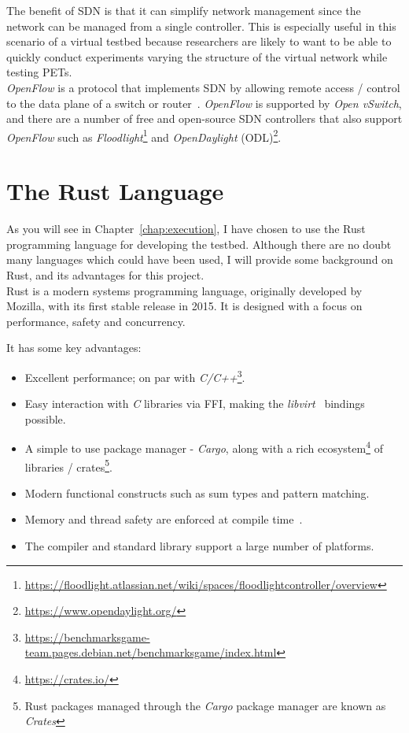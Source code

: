 \documentclass[
    author={Jacob Daniel Halsey},
    supervisor={Prof. Awais Rashid},
    degree={BSc},
    title={Building a Testbed for Evaluating Privacy Enhancing Technologies  (PETs)},
    subtitle={},
    type={software development},
    year={2021}
]{dissertation}
\begin{document}
The benefit of SDN is that it can simplify network management since the network can be 
managed from a single controller. This is especially useful in this scenario of 
a virtual testbed because researchers are likely to want to be able to quickly conduct experiments 
varying the structure of the virtual network while testing PETs.\\

\emph{OpenFlow} is a protocol that implements SDN by allowing remote access / control to the data plane
of a switch or router~\cite{openflow}. \emph{OpenFlow} is supported by \emph{Open vSwitch}, and there
are a number of free and open-source SDN controllers that also support \emph{OpenFlow} such as
\emph{Floodlight}\footnote{\url{https://floodlight.atlassian.net/wiki/spaces/floodlightcontroller/overview}}
and \emph{OpenDaylight} (ODL)\footnote{\url{https://www.opendaylight.org/}}.

\section{The Rust Language}

As you will see in Chapter~\ref{chap:execution}, I have chosen to use the Rust programming
language for developing the testbed. Although there are no doubt many languages which
could have been used, I will provide some background on Rust, and its advantages for this
project. \\

Rust is a modern systems programming language, originally developed by Mozilla, 
with its first stable release in 2015. It is designed with a focus on performance, safety
and concurrency. \\

\begin{singlespace}
	It has some key advantages:
	\begin{itemize}
		\item Excellent performance; on par with
		 \emph{C/C++}\footnote{\url{https://benchmarksgame-team.pages.debian.net/benchmarksgame/index.html}}.
		\item Easy interaction with \emph{C} libraries via FFI, making 
		the \emph{libvirt}~\cite{libvirt_rust} bindings possible.
		\item A simple to use package manager - \emph{Cargo},
		along with a rich ecosystem\footnote{\url{https://crates.io/}} of 
		libraries / crates\footnote{Rust packages 
			managed through the \emph{Cargo} package
				manager are known as \emph{Crates}}.
		\item Modern functional constructs such as sum types and pattern matching.
		\item Memory and thread safety are enforced at compile time~\cite{systems_rust}.
		\item The compiler and standard library support a large number of platforms.
	\end{itemize}
\end{singlespace}
\end{document}
